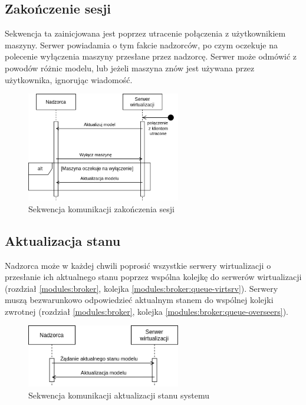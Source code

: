 \documentclass[../opis-rozwiazania.tex]{subfiles}
\begin{document}
\subsection{Zakończenie sesji}

Sekwencja ta zainicjowana jest poprzez utracenie połączenia z użytkownikiem maszyny.
Serwer powiadamia o tym fakcie nadzorców, po czym oczekuje na polecenie wyłączenia maszyny przesłane przez nadzorcę. Serwer może odmówić z powodów różnic modelu, lub jeżeli maszyna znów jest używana przez użytkownika, ignorując wiadomość.

\begin{figure}[H]
    \centering
    \includegraphics[width=0.6\textwidth]{../diagrams/sequence_diagrams/konczenie_sesji.png}
    \caption{Sekwencja komunikacji zakończenia sesji}
    \label{figure:diagrams:sequence_diagrams:konczenie_sesji}
\end{figure}

\subsection{Aktualizacja stanu}

Nadzorca może w każdej chwili poprosić wszystkie serwery wirtualizacji
o przesłanie ich aktualnego stanu poprzez wspólna kolejkę do serwerów wirtualizacji (rozdział \ref{modules:broker}, kolejka \ref{modules:broker:queue-virtsrv}).
Serwery muszą bezwarunkowo odpowiedzieć aktualnym stanem do wspólnej kolejki zwrotnej (rozdział \ref{modules:broker}, kolejka \ref{modules:broker:queue-overseers}).

\begin{figure}[H]
    \centering
    \includegraphics[width=0.6\textwidth]{../diagrams/sequence_diagrams/aktualizacja_stanu.png}
    \caption{Sekwencja komunikacji aktualizacji stanu systemu}
    \label{figure:diagrams:sequence_diagrams:aktualizacja_stanu}
\end{figure}
\end{document}
